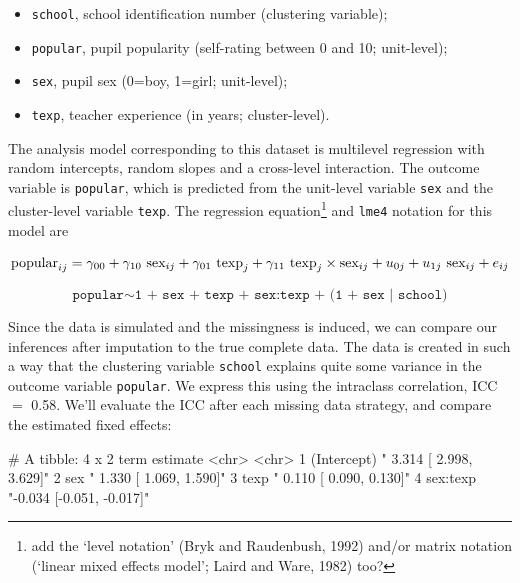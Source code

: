 \documentclass[
]{jss}
\providecommand{\tightlist}{%
  \setlength{\itemsep}{0pt}\setlength{\parskip}{0pt}}
\begin{document}
\begin{itemize}
\tightlist
\item
  \texttt{school}, school identification number (clustering variable);
\item
  \texttt{popular}, pupil popularity (self-rating between 0 and 10;
  unit-level);
\item
  \texttt{sex}, pupil sex (0=boy, 1=girl; unit-level);
\item
  \texttt{texp}, teacher experience (in years; cluster-level).
\end{itemize}

The analysis model corresponding to this dataset is multilevel
regression with random intercepts, random slopes and a cross-level
interaction. The outcome variable is \texttt{popular}, which is
predicted from the unit-level variable \texttt{sex} and the
cluster-level variable \texttt{texp}. The regression equation\footnote{add
  the `level notation' (Bryk and Raudenbush, 1992) and/or matrix
  notation (`linear mixed effects model'; Laird and Ware, 1982) too?}
and \texttt{lme4} notation for this model are

\[
\text{popular}_{ij} =
\gamma_{00} + 
\gamma_{10} \text{ sex}_{ij} + 
\gamma_{01} \text{ texp}_{j} + 
\gamma_{11} \text{ texp}_{j} \times \text{sex}_{ij} + 
u_{0j} + 
u_{1j} \text{ sex}_{ij} + 
e_{ij} \\
\]

\[
\texttt{popular} \sim  \texttt{1 + sex + texp + sex:texp + (1 + sex | school)}
\]

Since the data is simulated and the missingness is induced, we can
compare our inferences after imputation to the true complete data. The
data is created in such a way that the clustering variable
\texttt{school} explains quite some variance in the outcome variable
\texttt{popular}. We express this using the intraclass correlation, ICC
\(=\) 0.58. We'll evaluate the ICC after each missing data strategy, and
compare the estimated fixed effects:

\begin{CodeChunk}
\begin{CodeOutput}
# A tibble: 4 x 2
  term        estimate                 
  <chr>       <chr>                    
1 (Intercept) " 3.314 [ 2.998,  3.629]"
2 sex         " 1.330 [ 1.069,  1.590]"
3 texp        " 0.110 [ 0.090,  0.130]"
4 sex:texp    "-0.034 [-0.051, -0.017]"
\end{CodeOutput}
\end{CodeChunk}
\end{document}
